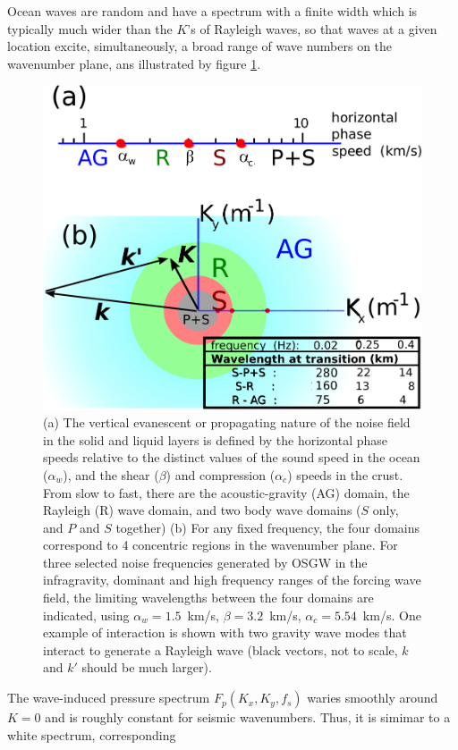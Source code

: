 Ocean waves are random and have a spectrum with a finite width which is typically much wider than the $K$'s of Rayleigh waves, so that waves at a given location excite, simultaneously, a broad range of wave numbers 
on the wavenumber plane, ans illustrated by figure \ref{fig:4domains}.
\begin{figure}[htb]
\centerline{\includegraphics[width=0.55\columnwidth]{FIGS_CH_SISMO/schematic_fig1_v3.pdf}}
  \caption{(a) 
The vertical evanescent or propagating nature of the noise field in the solid and liquid layers is 
defined  by the horizontal phase speeds relative to the distinct values of the sound speed 
in the ocean ($\alpha_w$), and the shear ($\beta$) and compression ($\alpha_c$) speeds in the crust.
 From slow to fast, there are the acoustic-gravity (AG) domain, the Rayleigh (R) wave 
domain, and two body wave domains ($S$ only, and $P$ and $S$ together) 
(b)  For any fixed frequency, the four domains correspond to 4 concentric regions 
in the wavenumber plane. For three selected noise frequencies generated by  OSGW in the  infragravity, dominant and high frequency ranges of the forcing 
wave field, the limiting wavelengths between the four domains are indicated, using $\alpha_w=1.5$~km/s, $\beta=3.2$~km/s, 
$\alpha_c=5.54$~km/s. One example of interaction is shown with 
two gravity wave modes that interact to generate a Rayleigh wave  (black vectors, not to scale, $k$ and $k'$ should be much larger).}
\label{fig:4domains}
\end{figure}
The wave-induced pressure spectrum $F_p(K_x,K_y,f_s)$ waries smoothly around $K=0$ and is roughly constant for seismic wavenumbers. Thus, it is simimar to a white spectrum, corresponding 
